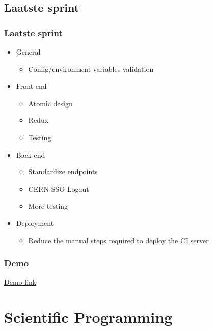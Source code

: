 \documentclass[12pt]{beamer}
\begin{document}
    \subsection{Laatste sprint}
    \begin{frame}
        \frametitle{Laatste sprint}
        \begin{itemize}
            \item General
            \begin{itemize}
                \item Config/environment variables validation
            \end{itemize}
            \item Front end
            \begin{itemize}
                \item Atomic design
                \item Redux
                \item Testing
            \end{itemize}
            \item Back end
            \begin{itemize}
                \item Standardize endpoints
                \item CERN SSO Logout
                \item More testing
            \end{itemize}
            \item Deployment
            \begin{itemize}
                \item Reduce the manual steps required to deploy the CI server
            \end{itemize}
        \end{itemize}
    \end{frame}

    \begin{frame}
        \frametitle{Demo}
        \href{http://dev-jiskefet.westeurope.cloudapp.azure.com/}{Demo link}
    \end{frame}

    \section{Scientific Programming}
\end{document}
